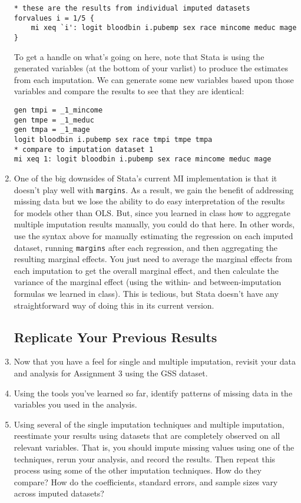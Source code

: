 \documentclass[a4paper,12pt]{article}
\begin{document}
\begin{enumerate}
\begin{verbatim}
* these are the results from individual imputed datasets
forvalues i = 1/5 {
	mi xeq `i': logit bloodbin i.pubemp sex race mincome meduc mage
}
\end{verbatim}

To get a handle on what's going on here, note that Stata is using the generated variables (at the bottom of your varlist) to produce the estimates from each imputation. We can generate some new variables based upon those variables and compare the results to see that they are identical:
\begin{verbatim}
gen tmpi = _1_mincome
gen tmpe = _1_meduc
gen tmpa = _1_mage
logit bloodbin i.pubemp sex race tmpi tmpe tmpa
* compare to imputation dataset 1
mi xeq 1: logit bloodbin i.pubemp sex race mincome meduc mage
\end{verbatim}

\item One of the big downsides of Stata's current MI implementation is that it doesn't play well with \texttt{margins}. As a result, we gain the benefit of addressing missing data but we lose the ability to do easy interpretation of the results for models other than OLS. But, since you learned in class how to aggregate multiple imputation results manually, you could do that here. In other words, use the syntax above for manually estimating the regression on each imputed dataset, running \texttt{margins} after each regression, and then aggregating the resulting marginal effects. You just need to average the marginal effects from each imputation to get the overall marginal effect, and then calculate the variance of the marginal effect (using the within- and between-imputation formulas we learned in class). This is tedious, but Stata doesn't have any straightforward way of doing this in its current version.

\subsection*{Replicate Your Previous Results}

\item Now that you have a feel for single and multiple imputation, revisit your data and analysis for Assignment 3 using the GSS dataset.

\item Using the tools you've learned so far, identify patterns of missing data in the variables you used in the analysis.

\item Using several of the single imputation techniques and multiple imputation, reestimate your results using datasets that are completely observed on all relevant variables. That is, you should impute missing values using one of the techniques, rerun your analysis, and record the results. Then repeat this process using some of the other imputation techniques. How do they compare? How do the coefficients, standard errors, and sample sizes vary across imputed datasets?


\end{enumerate}
\end{document}
